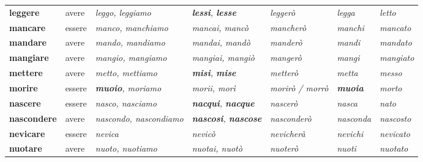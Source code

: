 \documentclass[11pt,a4paper,twoside,openright]{book}
\newcommand{\irr}[1]{{\color{exccol}\bfseries #1}}
\begin{document}
{\begin{xltabular}{\linewidth}{@{}>{\raggedright\arraybackslash}p{2.7cm} l L L l >{\raggedright\arraybackslash}p{1.9cm} l@{}}
\textbf{leggere} & avere & \textit{leggo, leggiamo} & \textit{\irr{lessi}, \irr{lesse}} & \textit{leggerò} & \textit{legga} & \textit{letto} \\
\textbf{mancare} & essere & \textit{manco, manchiamo} & \textit{mancai, mancò} & \textit{mancherò} & \textit{manchi} & \textit{mancato} \\
\textbf{mandare} & avere & \textit{mando, mandiamo} & \textit{mandai, mandò} & \textit{manderò} & \textit{mandi} & \textit{mandato} \\
\textbf{mangiare} & avere & \textit{mangio, mangiamo} & \textit{mangiai, mangiò} & \textit{mangerò} & \textit{mangi} & \textit{mangiato} \\
\textbf{mettere} & avere & \textit{metto, mettiamo} & \textit{\irr{misi}, \irr{mise}} & \textit{metterò} & \textit{metta} & \textit{messo} \\
\textbf{morire} & essere & \textit{\irr{muoio}, moriamo} & \textit{morii, morì} & \textit{morirò / morrò} & \textit{\irr{muoia}} & \textit{morto} \\
\textbf{nascere} & essere & \textit{nasco, nasciamo} & \textit{\irr{nacqui}, \irr{nacque}} & \textit{nascerò} & \textit{nasca} & \textit{nato} \\
\textbf{nascondere} & avere & \textit{nascondo, nascondiamo} & \textit{\irr{nascosi}, \irr{nascose}} & \textit{nasconderò} & \textit{nasconda} & \textit{nascosto} \\
\textbf{nevicare} & essere & \textit{nevica} & \textit{nevicò} & \textit{nevicherà} & \textit{nevichi} & \textit{nevicato} \\
\textbf{nuotare} & avere & \textit{nuoto, nuotiamo} & \textit{nuotai, nuotò} & \textit{nuoterò} & \textit{nuoti} & \textit{nuotato} \\

\end{xltabular}}
\end{document}
